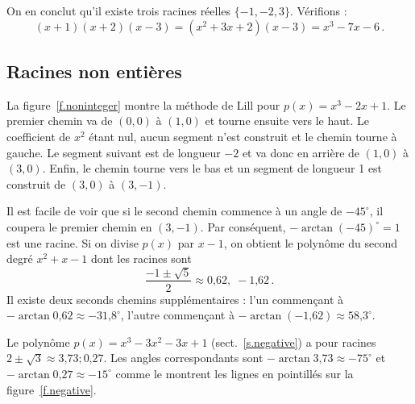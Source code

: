 On en conclut qu'il existe trois racines réelles $\{-1,-2,3\}$.
Vérifions :
\[
(x+1)(x+2)(x-3)=(x^2+3x+2)(x-3) =x^3-7x-6\,.
\]


\subsection{Racines non entières}\label{s.noninteger}

La figure~\ref{f.noninteger} montre la méthode de Lill pour $p(x)=x^3-2x+1$. Le premier chemin va de $(0,0)$ à $(1,0)$ et tourne ensuite vers le haut. Le coefficient de $x^2$ étant nul, aucun segment  n'est construit et le chemin tourne à gauche. Le segment  suivant est de longueur $-2$ et va donc en arrière de $(1,0)$ à $(3,0)$. Enfin, le chemin tourne vers le bas et un segment 
 de longueur 1 est construit de $(3,0)$ à $(3,-1)$.

Il est facile de voir que si le second chemin commence à un angle de $-45^\circ$, il coupera le premier chemin en  $(3,-1)$. Par conséquent, $-\arctan (-45)^\circ=1$ est une racine. Si on divise $p(x)$ par $x-1$, on obtient le polynôme du second degré $x^2+x-1$ dont les racines sont 
\[
\frac{-1\pm\sqrt{5}}{2} \approx \mbox{0,62},\; -\mbox{1,62}\,.
\]
Il existe deux seconds chemins supplémentaires : l'un commençant à $-\arctan \mbox{0,62}\approx -\mbox{31,8}^\circ$,  l'autre commençant à $-\arctan(-\mbox{1,62})\approx \mbox{58,3}^\circ$.

Le polynôme $p(x)=x^3-3x^2-3x+1$ (sect.~\ref{s.negative}) a pour racines $ 2\pm\sqrt{3}\approx \mbox{3,73}; \mbox{0,27}$. Les angles correspondants sont $-\arctan \mbox{3,73} \approx -75^\circ$ et $-\arctan \mbox{0,27} \approx -15^\circ$ comme le montrent les lignes en pointillés sur la figure~\ref{f.negative}.


